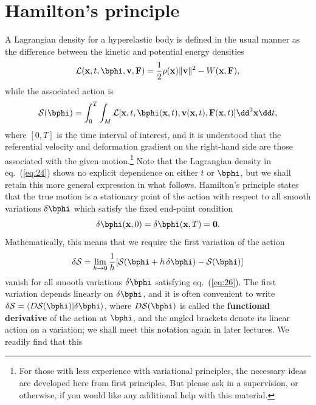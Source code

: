\section*{Hamilton's principle}
A Lagrangian density for a hyperelastic body is defined in the usual manner as the difference between the kinetic and potential energy densities
\begin{equation}
\mathcal{L}(\mathbf{x},t,\bphi,\mathbf{v},\mathbf{F})=\frac{1}{2}\rho(\mathbf{x})\|\mathbf{v}\|^{2}-W(\mathbf{x},\mathbf{F}),
\label{eq:24}
\end{equation}
while the associated action is
\begin{equation}
\mathcal{S}(\bphi)=\int_{0}^{T}\int_{M}\mathcal{L}[\mathbf{x},t,\bphi(\mathbf{x},t),\mathbf{v}(\mathbf{x},t),\mathbf{F}(\mathbf{x},t)]\dd^{3}\mathbf{x}\dd t,
\label{eq:25}
\end{equation}
where $[0, T]$ is the time interval of interest, and it is understood that the referential velocity and deformation 
gradient on the right-hand side are those associated with the given motion.\footnote{For those with less experience with variational principles, 
the necessary ideas are developed here from first principles. But please ask in a supervision, or otherwise, if you would 
like any additional help with this material.} Note that the Lagrangian density in eq.~(\ref{eq:24}) 
shows no explicit dependence on either $t$ or $\bphi$, but we shall 
retain this more general expression in what follows. Hamilton's principle states that the true motion is a stationary point 
of the action with respect to all smooth variations $\delta\bphi$ which satisfy the fixed end-point condition
\begin{equation}
\delta\bphi(\mathbf{x},0)=\delta\bphi(\mathbf{x},T)=\mathbf{0}.
\label{eq:26}
\end{equation}
Mathematically, this means that we require the first variation of the action
\begin{equation}
\delta\mathcal{S}=\lim_{h\rightarrow0}\frac{1}{h}[\mathcal{S}(\bphi+h\,\delta\bphi)-\mathcal{S}(\bphi)]
\label{eq:27}
\end{equation}
vanish for all smooth variations $\delta\bphi$ satisfying eq.~(\ref{eq:26}). The first variation depends linearly on $\delta\bphi$, and it is often convenient to write 
$\delta\mathcal{S}=\langle D\mathcal{S}(\bphi)|\delta\bphi\rangle$, where $D\mathcal{S}(\bphi)$ is called the 
\textbf{functional derivative} of the action at $\bphi$, and the angled brackets denote its linear action on a 
variation; we shall meet this notation again in later lectures. We readily find that this 
